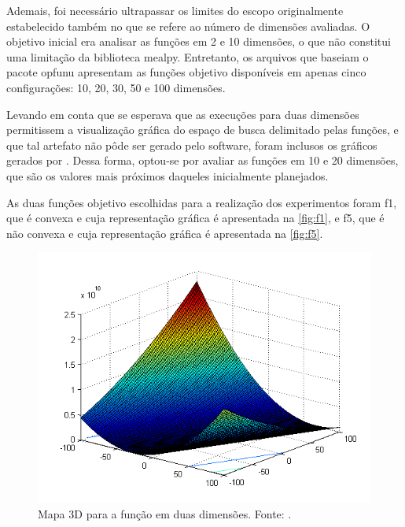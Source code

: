 Ademais, foi necessário ultrapassar os limites do escopo originalmente estabelecido também no que se refere ao número de dimensões avaliadas.
O objetivo inicial era analisar as funções em 2 e 10 dimensões, o que não constitui uma limitação da biblioteca \gls{mealpy}.
Entretanto, os arquivos que baseiam o pacote \gls{opfunu} apresentam as funções objetivo disponíveis em apenas cinco configurações: 10, 20, 30, 50 e 100 dimensões.

Levando em conta que se esperava que as execuções para duas dimensões permitissem a visualização gráfica do espaço de busca delimitado pelas funções, e que tal artefato não pôde ser gerado pelo software, foram inclusos os gráficos gerados por .
Dessa forma, optou-se por avaliar as funções em 10 e 20 dimensões, que são os valores mais próximos daqueles inicialmente planejados.

As duas funções objetivo escolhidas para a realização dos experimentos foram \gls{f1}, que é convexa e cuja representação gráfica é apresentada na \autoref{fig:f1}, e \gls{f5}, que é não convexa e cuja representação gráfica é apresentada na \autoref{fig:f5}.

\begin{figure}[!ht]%
    \centering
    \includegraphics[scale=0.5]{img/f1.png}
    \caption{Mapa 3D para a função  em duas dimensões. Fonte: .}%
    \label{fig:f1}
\end{figure}

